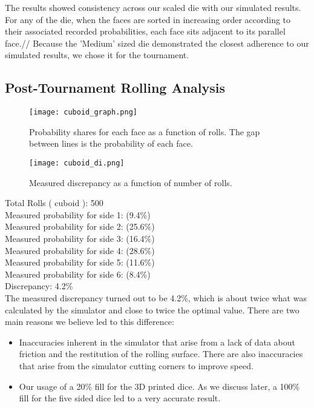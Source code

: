 The results showed consistency across our scaled die with our simulated results. For any of the die, when the faces are sorted in increasing order according to their associated recorded probabilities, each face sits adjacent to its parallel face.//
Because the 'Medium' sized die demonstrated the closest adherence to our simulated results, we chose it for the tournament.

\subsection{Post-Tournament Rolling Analysis}
\begin{figure}[h]
\center
\texttt{[image: cuboid\_graph.png]}
\caption{Probability shares for each face as a function of rolls. The gap between lines is the probability of each face.}
\label{fig:cuboid}
\end{figure}
\begin{figure}[h]
\center
\texttt{[image: cuboid\_di.png]}
\caption{Measured discrepancy as a function of number of rolls.}
\label{fig:cuboidd}
\end{figure}
Total Rolls ( cuboid ): 500\\
Measured probability for side 1: (9.4\%)\\
Measured probability for side 2: (25.6\%)\\
Measured probability for side 3: (16.4\%)\\
Measured probability for side 4: (28.6\%)\\
Measured probability for side 5: (11.6\%)\\
Measured probability for side 6: (8.4\%)\\
Discrepancy: 4.2\%\\
The measured discrepancy turned out to be 4.2\%, which is about twice what was calculated by the simulator and close to twice the optimal value. There are two main reasons we believe led to this difference:\\
\begin{itemize}
    \item Inaccuracies inherent in the simulator that arise from a lack of data about friction and the restitution of the rolling surface. There are also inaccuracies that arise from the simulator cutting corners to improve speed.\\
    \item Our usage of a 20\% fill for the 3D printed dice. As we discuss later, a 100\% fill for the five sided dice led to a very accurate result.
\end{itemize}


